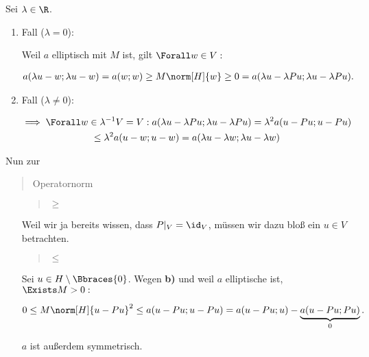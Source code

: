 \begin{solution}
\begin{enumerate}[label = \textbf{\alph*)}]
\begin{itemize}
    Sei $\lambda \in \R$.

    \begin{enumerate}[label = \arabic*.]

      \item Fall ($\lambda = 0$):
      
      Weil $a$ elliptisch mit $M$ ist, gilt $\Forall w \in V:$

      \begin{align*}
        a(\lambda u - w; \lambda u - w)
        =
        a(w; w)
        \geq
        M \norm[H]{w}
        \geq
        0 = a(\lambda u - \lambda Pu; \lambda u - \lambda Pu).
      \end{align*}

      \item Fall ($\lambda \neq 0$):

      \begin{multline*}
        \implies
        \Forall w \in \lambda^{-1} V = V:
        a(\lambda u - \lambda Pu;\lambda u - \lambda Pu)
        =
        \lambda^2 a(u - Pu;u - Pu) \\
        \leq
        \lambda^2 a(u - w; u - w)
        =
        a(\lambda u - \lambda w; \lambda u - \lambda w)
      \end{multline*}
    
    \end{enumerate}

\end{itemize}

  Nun zur \blockquote{Operatornorm}.

  \begin{itemize}

    \item
    [\blockquote{$\geq$}:]

    Weil wir ja bereits wissen, dass $P|_V = \id_V$, müssen wir dazu bloß ein $u \in V$ betrachten.

    \item
    [\blockquote{$\leq$}:]

    Sei $u \in H \setminus \Bbraces{0}$.
    Wegen \textbf{b)} und weil $a$ elliptische ist, $\Exists M > 0:$

    \begin{align*}
      0 \leq M \norm[H]{u - Pu}^2
      \leq
      a(u - Pu; u - Pu)
      =
      a(u - Pu; u)
      -
      \underbrace{a(u - Pu; Pu)}_0.
    \end{align*}

    $a$ ist außerdem symmetrisch.


\end{itemize}
\end{enumerate}
\end{solution}
